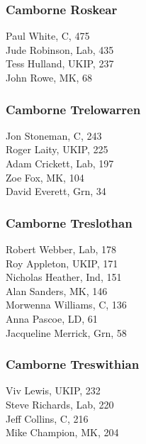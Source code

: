 \documentclass[a4paper,openany,10pt]{book}
\begin{document}
\subsubsection*{Camborne Roskear}



Paul White, C, 475\\
Jude Robinson, Lab, 435\\
Tess Hulland, UKIP, 237\\
John Rowe, MK, 68\\


\subsubsection*{Camborne Trelowarren}



Jon Stoneman, C, 243\\
Roger Laity, UKIP, 225\\
Adam Crickett, Lab, 197\\
Zoe Fox, MK, 104\\
David Everett, Grn, 34\\


\subsubsection*{Camborne Treslothan}



Robert Webber, Lab, 178\\
Roy Appleton, UKIP, 171\\
Nicholas Heather, Ind, 151\\
Alan Sanders, MK, 146\\
Morwenna Williams, C, 136\\
Anna Pascoe, LD, 61\\
Jacqueline Merrick, Grn, 58\\


\subsubsection*{Camborne Treswithian}



Viv Lewis, UKIP, 232\\
Steve Richards, Lab, 220\\
Jeff Collins, C, 216\\
Mike Champion, MK, 204\\
\end{document}
